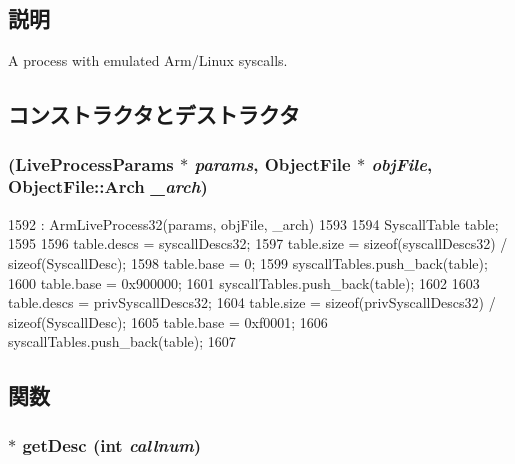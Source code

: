 \subsection{説明}
A process with emulated Arm/Linux syscalls. 

\subsection{コンストラクタとデストラクタ}
\hypertarget{classArmLinuxProcess32_a9ee1b5be9a1dc6fb85f2980dda11a967}{
\subsubsection[{ArmLinuxProcess32}]{ (LiveProcessParams $\ast$ {\em params}, \/  {\bf ObjectFile} $\ast$ {\em objFile}, \/  {\bf ObjectFile::Arch} {\em \_\-arch})}}
\label{classArmLinuxProcess32_a9ee1b5be9a1dc6fb85f2980dda11a967}



\begin{DoxyCode}
1592     : ArmLiveProcess32(params, objFile, _arch)
1593 {
1594     SyscallTable table;
1595 
1596     table.descs = syscallDescs32;
1597     table.size = sizeof(syscallDescs32) / sizeof(SyscallDesc);
1598     table.base = 0;
1599     syscallTables.push_back(table);
1600     table.base = 0x900000;
1601     syscallTables.push_back(table);
1602 
1603     table.descs = privSyscallDescs32;
1604     table.size = sizeof(privSyscallDescs32) / sizeof(SyscallDesc);
1605     table.base = 0xf0001;
1606     syscallTables.push_back(table);
1607 }
\end{DoxyCode}


\subsection{関数}
\hypertarget{classArmLinuxProcess32_aebbff609a7235342925445690acf5ee8}{
\subsubsection[{getDesc}]{ $\ast$ getDesc (int {\em callnum})}}
\label{classArmLinuxProcess32_aebbff609a7235342925445690acf5ee8}



